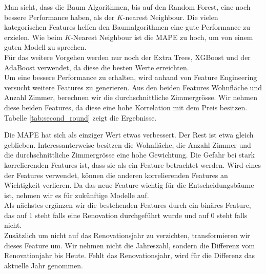 Man sieht, dass die Baum Algorithmen, bis auf den Random Forest, eine noch bessere Performance haben, als der $K$-nearest Neighbour. Die vielen kategorischen Features helfen den Baumalgorithmen eine gute Performance zu erzielen. Wie beim $K$-Nearest Neighbour ist die MAPE zu hoch, um von einem guten Modell zu sprechen.\\[2ex]
%
Für das weitere Vorgehen werden nur noch der Extra Trees, XGBoost und der AdaBoost verwendet, da diese die besten Werte erreichten.\\[2ex]
%
Um eine bessere Performance zu erhalten, wird anhand von Feature Engineering versucht weitere Features zu generieren. Aus den beiden Features Wohnfläche und Anzahl Zimmer, berechnen wir die durchschnittliche Zimmergrösse. Wir nehmen diese beiden Features, da diese eine hohe Korrelation mit dem Preis besitzen. Tabelle \ref{tab:second_round} zeigt die Ergebnisse.\\[2ex]
%
\begin{table}[ht]
\centering
{}
\caption{Ergebnisse mit durchschnittlicher Zimmergrösse}
\label{tab:second_round}
\end{table}
%
Die MAPE hat sich als einziger Wert etwas verbessert. Der Rest ist etwa gleich geblieben. Interessanterweise besitzen die Wohnfläche, die Anzahl Zimmer und die durchschnittliche Zimmergrösse eine hohe Gewichtung. Die Gefahr bei stark korrelierenden Features ist, dass sie als ein Feature betrachtet werden. Wird eines der Features verwendet, können die anderen korrelierenden Features an Wichtigkeit verlieren. Da das neue Feature wichtig für die Entscheidungsbäume ist, nehmen wir es für zukünftige Modelle auf.\\[2ex]
%
Als nächstes ergänzen wir die bestehenden Features durch ein binäres Feature, das auf 1 steht falls eine Renovation durchgeführt wurde und auf 0 steht falls nicht.\\
Zusätzlich um nicht auf das Renovationsjahr zu verzichten, transformieren wir dieses Feature um. Wir nehmen nicht die Jahreszahl, sondern die Differenz vom Renovationjahr bis Heute. Fehlt das Renovationsjahr, wird für die Differenz das aktuelle Jahr genommen.\\
